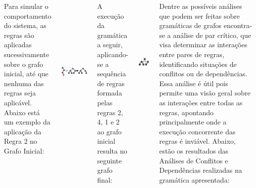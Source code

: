 \documentclass[25pt, a0paper]{tikzposter}
\begin{document}
\begin{columns}
{            Para simular o comportamento do sistema, as regras são aplicadas sucessivamente sobre o grafo inicial, até que nenhuma das regras seja aplicável. Abaixo está um exemplo da aplicação da Regra 2 no Grafo Inicial: \\

            \begin{center}
                \includegraphics[height=7.5cm,keepaspectratio]{./Gramatica/Application_Rule1.pdf}
            \end{center}

            A execução da gramática a seguir, aplicando-se a sequência de regras formada pelas regras 2, 4, 1 e 2 ao grafo inicial resulta no seguinte grafo final:
            \begin{center}
                \includegraphics[height=6.5cm,keepaspectratio]{./Gramatica/Final.pdf}
            \end{center}

            \LARGE
            Dentre as possíveis análises que podem ser feitas sobre gramáticas de grafos encontra-se a análise de par crítico, que visa determinar as interações entre pares de regras, identificando situações de conflitos ou de dependências. Essa análise é útil pois permite uma visão geral sobre as interações entre todas as regras, apontando principalmente onde a execução concorrente das regras é inviável. Abaixo, estão os resultados das Análises de Conflitos e Dependências realizadas na gramática apresentada:

}
\end{columns}
\end{document}
